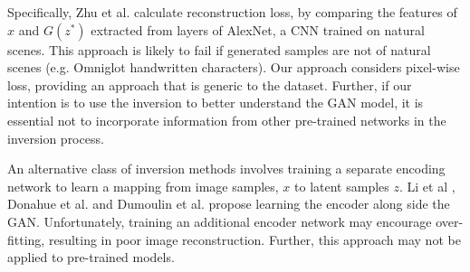 \documentclass[journal]{IEEEtran}
\begin{document}




Specifically, Zhu et al. \cite{zhu2016generative} calculate reconstruction loss, by comparing the features of $x$ and $G(z^*)$ extracted from layers of AlexNet, a CNN trained on natural scenes. This approach is likely to fail if generated samples are not of natural scenes (e.g. Omniglot handwritten characters). Our approach considers pixel-wise loss, providing an approach that is generic to the dataset. Further, if our intention is to use the inversion to better understand the GAN model, it is essential not to incorporate information from other pre-trained networks in the inversion process.


An alternative class of inversion methods involves training a separate encoding network to learn a mapping from image samples, $x$ to latent samples $z$. Li et al \cite{li2017alice}, Donahue et al. \cite{donahue2016adversarial} and Dumoulin et al. \cite{dumoulin2016adversarially} propose learning the encoder along side the GAN. Unfortunately, training an additional encoder network may encourage over-fitting, resulting in poor image reconstruction. Further, this approach may not be applied to pre-trained models. 
\end{document}
